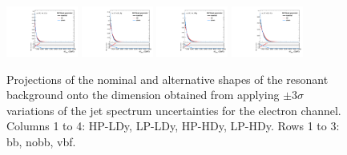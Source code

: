 \begin{figure}[htbp]
  \includegraphics[width=0.21\textwidth]{fig/uncertainties/systs_res_e_HP_vbf_LDy_MVVScale_ProjX.pdf}
  \includegraphics[width=0.21\textwidth]{fig/uncertainties/systs_res_e_LP_vbf_LDy_MVVScale_ProjX.pdf}
  \includegraphics[width=0.21\textwidth]{fig/uncertainties/systs_res_e_HP_vbf_HDy_MVVScale_ProjX.pdf}
  \includegraphics[width=0.21\textwidth]{fig/uncertainties/systs_res_e_LP_vbf_HDy_MVVScale_ProjX.pdf}\\
  \caption{
    Projections of the nominal and alternative shapes of the resonant background onto the \MVV dimension obtained from applying $\pm3\sigma$ variations of the jet \pt spectrum uncertainties for the electron channel.
    Columns 1 to 4: HP-LDy, LP-LDy, HP-HDy, LP-HDy.
    Rows 1 to 3: bb, nobb, vbf.
  }
  \label{fig:systResMVV_MVVScale}
\end{figure}

